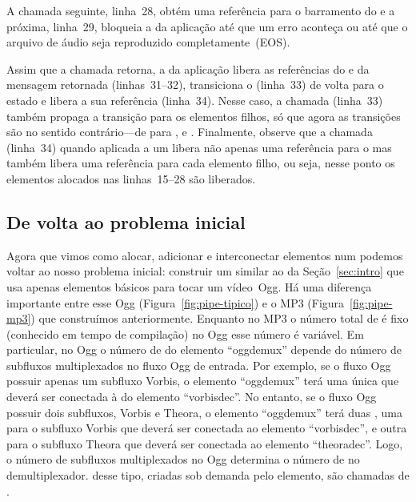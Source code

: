 \documentclass{SBCbookchapter}
\begin{document}
A chamada seguinte, linha~28, obtém uma referência para o barramento do
 e a próxima, linha~29, bloqueia a  da aplicação até
que um erro aconteça ou até que o arquivo de áudio seja reproduzido
completamente~(EOS).

Assim que a chamada  retorna, a  da
aplicação libera as referências do  e da mensagem retornada
(linhas~31--32), transiciona o  (linha~33) de volta para o
estado  e libera a sua referência (linha~34).  Nesse caso, a
chamada  (linha~33) também propaga a transição para
os elementos filhos, só que agora as transições são no sentido
contrário---de  para ,  e .
Finalmente, observe que a chamada  (linha~34) quando
aplicada a um  libera não apenas uma referência para o  mas
também libera uma referência para cada elemento filho, ou seja, nesse ponto
os elementos alocados nas linhas~15--28 são liberados.


\subsection*{De volta ao problema inicial}

Agora que vimos como alocar, adicionar e interconectar elementos num
 podemos voltar ao nosso problema inicial: construir um
 similar ao da Seção~\ref{sec:intro} que usa apenas elementos
básicos para tocar um vídeo~Ogg.  Há uma diferença importante entre esse
 Ogg (Figura~\ref{fig:pipe-tipico}) e o  MP3
(Figura~\ref{fig:pipe-mp3}) que construímos anteriormente.  Enquanto no
 MP3 o número total de  é fixo (conhecido em tempo de
compilação) no  Ogg esse número é variável.  Em particular, no
 Ogg o número de  do elemento ``oggdemux''
depende do número de subfluxos multiplexados no fluxo Ogg de entrada.  Por
exemplo, se o fluxo Ogg possuir apenas um subfluxo Vorbis, o elemento
``oggdemux'' terá uma única  que deverá ser conectada à
 do elemento ``vorbisdec''.  No entanto, se o fluxo Ogg
possuir dois subfluxos, Vorbis e Theora, o elemento ``oggdemux'' terá duas
, uma para o subfluxo Vorbis que deverá ser conectada ao
elemento ``vorbisdec'', e outra para o subfluxo Theora que deverá ser
conectada ao elemento ``theoradec''.  Logo, o número de subfluxos
multiplexados no Ogg determina o número de  no
demultiplexador.   desse tipo, criadas sob demanda pelo elemento,
são chamadas de .
\end{document}
